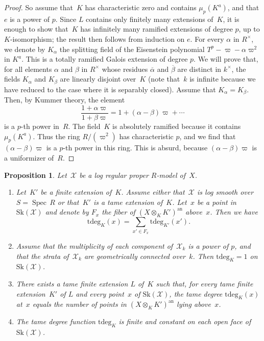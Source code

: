\documentclass[JEP,XML,SOM,Unicode,NoFloatCountersInSection]{cedram}
\newtheorem{prop}[equation]{Proposition}
\theoremstyle{definition}
\numberwithin{equation}{subsection}
\newcommand{\cX}{\ensuremath{\mathscr{X}}}
\newcommand{\an}{\mathrm{an}}
\newcommand{\Sk}{\mathrm{Sk}}
\newcommand{\tdeg}{\mathrm{tdeg}}
\DeclareMathOperator{\Spec}{Spec}
\let\unif\varpi
\begin{document}
\begin{proof}
So assume that~$K$ has characteristic zero and contains $\mu_p(K^a)$, and that $e$ is a power of $p$. Since $L$ contains only finitely many extensions of~$K$, it is enough to show that~$K$ has infinitely many ramified extensions of degree $p$, up to $K$\nobreakdash-isomorphism; the result then follows from induction on $e$. For every $\alpha$ in $R^{\times}$, we denote by $K_\alpha$ the splitting field of the Eisenstein polynomial $T^p-\unif-\alpha\unif^2$ in $K^a$. This is a totally ramified Galois extension of degree $p$.
We will prove that, for all elements $\alpha$ and $\beta$ in $R^{\times}$ whose residues $\overline{\alpha}$ and $\overline{\beta}$ are distinct in $k^{\times}$, the fields $K_\alpha$ and $K_\beta$ are linearly disjoint over~$K$ (note that~$k$ is infinite because we have reduced to the case where it is separably closed). Assume that $K_\alpha=K_\beta$.
Then, by Kummer theory, the element
\[
\frac{1+\alpha\unif}{1+\beta\unif}=1+(\alpha-\beta)\unif + \cdots
\]
is a $p$-th power in~$R$. The field~$K$ is absolutely ramified because it contains $\mu_p(K^a)$. Thus the ring $R/(\unif^2)$ has characteristic $p$, and we find that $(\alpha-\beta)\unif$ is a $p$-th power in this ring. This is absurd, because $(\alpha-\beta)\unif$ is a uniformizer of~$R$.
\end{proof}

\begin{prop}\label{prop:tamedeg}
Let~$\cX$ be a log regular proper $R$\nobreakdash-model of~$X$.
\begin{enumerate}
\item \label{it:fib} Let~$K'$ be a finite extension of~$K$. Assume either that~$\cX$ is log smooth over $S=\Spec\,R$ or that~$K'$ is a tame extension of~$K$. Let~$x$ be a point in $\Sk(\cX)$ and denote by $F_x$ the fiber of $(X\otimes_K K')^{\an}$ above~$x$. Then we have
\[
\tdeg_K(x)=\sum_{x'\in F_x}\tdeg_{K'}(x').
\]
\item \label{it:one} Assume that the multiplicity of each component of~$\cX_k$ is a power of $p$, and that the strata of~$\cX_k$ are geometrically connected over~$k$. Then $\tdeg_K=1$ on $\Sk(\cX)$.
\item \label{it:split} There exists a tame finite extension $L$ of~$K$ such that, for
every tame finite extension~$K'$ of $L$ and every point~$x$ of $\Sk(\cX)$, the tame degree $\tdeg_K(x)$ at~$x$ equals the number of points in $(X\otimes_K K')^{\an}$ lying above~$x$.
\item \label{it:const} The tame degree function $\tdeg_K$ is finite and constant on each open face of
$\Sk(\cX)$.
\end{enumerate}
\end{prop}
\end{document}
